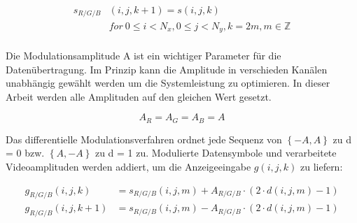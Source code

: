 \begin{equation}
\begin{split}
 s_{R/G/B}&(i,j,k+1) = s(i,j,k) \\
          &  for \ 0\le i <N_x, 0\le j<N_y,k=2m , m \in \mathbb{Z}\\
\end{split}
\end{equation}



Die Modulationsamplitude A ist ein wichtiger Parameter für die Datenübertragung. Im Prinzip kann die Amplitude in verschieden Kanälen unabhängig gewählt werden um die Systemleistung zu optimieren. In dieser Arbeit werden alle Amplituden auf den gleichen Wert gesetzt.

\begin{equation}
 A_R=A_G=A_B=A        
\end{equation}

Das differentielle Modulationsverfahren ordnet jede Sequenz von $\left\{-A, A\right\}$ zu d = 0 bzw. $\left\{A, -A\right\}$ zu d = 1 zu. Modulierte Datensymbole und verarbeitete Videoamplituden werden addiert, um die Anzeigeeingabe $g(i,j,k)$ zu liefern:

\begin{equation}
\begin{split}
   g_{R/G/B}(i,j,k)  &= s_{R/G/B}(i,j,m) + A_{R/G/B} \cdot \left( 2 \cdot d(i,j,m) - 1 \right) \\
   g_{R/G/B}(i,j,k+1)&= s_{R/G/B}(i,j,m) - A_{R/G/B} \cdot \left( 2 \cdot d(i,j,m) - 1 \right) \\
\end{split}
\end{equation}

